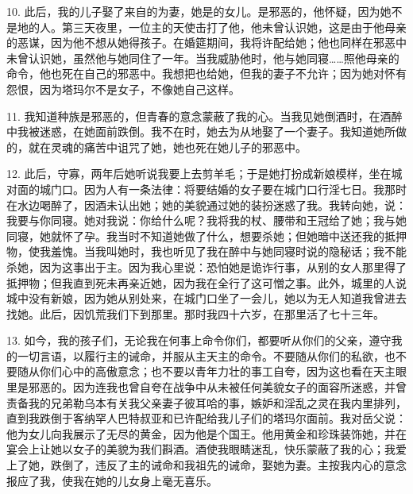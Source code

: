 10. 此后，我的儿子娶了来自的为妻，她是的女儿。是邪恶的，他怀疑，因为她不是地的人。第三天夜里，一位主的天使击打了他，他未曾认识她，这是由于他母亲的恶谋，因为他不想从她得孩子。在婚筵期间，我将许配给她；他也同样在邪恶中未曾认识她，虽然他与她同住了一年。当我威胁他时，他与她同寝……照他母亲的命令，他也死在自己的邪恶中。我想把也给她，但我的妻子不允许；因为她对怀有怨恨，因为塔玛尔不是女子，不像她自己这样。\par

11. 我知道种族是邪恶的，但青春的意念蒙蔽了我的心。当我见她倒酒时，在酒醉中我被迷惑，在她面前跌倒。我不在时，她去为从地娶了一个妻子。我知道她所做的，就在灵魂的痛苦中诅咒了她，她也死在她儿子的邪恶中。\par

12. 此后，守寡，两年后她听说我要上去剪羊毛；于是她打扮成新娘模样，坐在城对面的城门口。因为人有一条法律：将要结婚的女子要在城门口行淫七日。我那时在水边喝醉了，因酒未认出她；她的美貌通过她的装扮迷惑了我。我转向她，说：我要与你同寝。她对我说：你给什么呢？我将我的杖、腰带和王冠给了她；我与她同寝，她就怀了孕。我当时不知道她做了什么，想要杀她；但她暗中送还我的抵押物，使我羞愧。当我叫她时，我也听见了我在醉中与她同寝时说的隐秘话；我不能杀她，因为这事出于主。因为我心里说：恐怕她是诡诈行事，从别的女人那里得了抵押物；但我直到死未再亲近她，因为我在全行了这可憎之事。此外，城里的人说城中没有新娘，因为她从别处来，在城门口坐了一会儿，她以为无人知道我曾进去找她。此后，因饥荒我们下到那里。那时我四十六岁，在那里活了七十三年。\par

13. 如今，我的孩子们，无论我在何事上命令你们，都要听从你们的父亲，遵守我的一切言语，以履行主的诫命，并服从主天主的命令。不要随从你们的私欲，也不要随从你们心中的高傲意念；也不要以青年力壮的事工自夸，因为这也看在天主眼里是邪恶的。因为连我也曾自夸在战争中从未被任何美貌女子的面容所迷惑，并曾责备我的兄弟勒乌本有关我父亲妻子彼耳哈的事，嫉妒和淫乱之灵在我内里排列，直到我跌倒于客纳罕人巴特叔亚和已许配给我儿子们的塔玛尔面前。我对岳父说：他为女儿向我展示了无尽的黄金，因为他是个国王。他用黄金和珍珠装饰她，并在宴会上让她以女子的美貌为我们斟酒。酒使我眼睛迷乱，快乐蒙蔽了我的心；我爱上了她，跌倒了，违反了主的诫命和我祖先的诫命，娶她为妻。主按我内心的意念报应了我，使我在她的儿女身上毫无喜乐。\par

